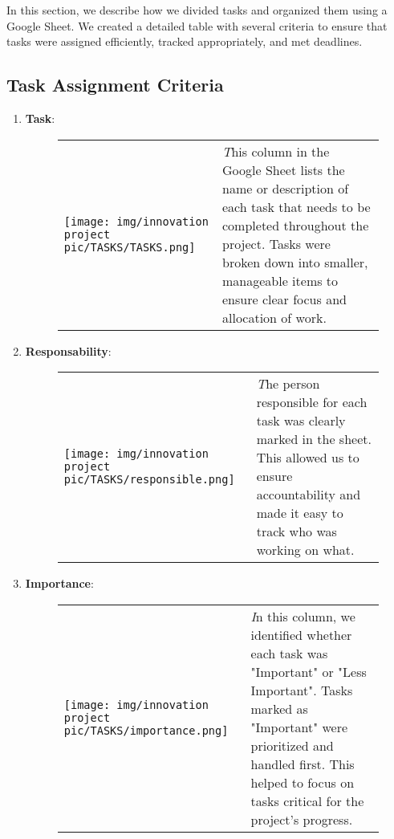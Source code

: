 In this section, we describe how we divided tasks and organized them using a Google Sheet. We created a detailed table with several criteria to ensure that tasks were assigned efficiently, tracked appropriately, and met deadlines. 

\subsection{Task Assignment Criteria}

\begin{enumerate}
    \item \textbf{Task}:

\begin{figure}[H]
   
    \begin{tabular}{m{} m{}}
        \texttt{[image: img/innovation project pic/TASKS/TASKS.png]} & 
        \textit This column in the Google Sheet lists the name or description of each task that needs to be completed throughout the project. Tasks were broken down into smaller, manageable items to ensure clear focus and allocation of work.
    \end{tabular}
\end{figure}
 
    \item \textbf{Responsability}:
\begin{figure}[H]
 
    \begin{tabular}{m{} m{}}
        \texttt{[image: img/innovation project pic/TASKS/responsible.png]} & 
        \textit The person responsible for each task was clearly marked in the sheet. This allowed us to ensure accountability and made it easy to track who was working on what.
    \end{tabular}
\end{figure}

\newpage

    \item \textbf{Importance}:
\begin{figure}[H]
    
    \begin{tabular}{m{} m{}}
        \texttt{[image: img/innovation project pic/TASKS/importance.png]} & 
        \textit In this column, we identified whether each task was "Important" or "Less Important". Tasks marked as "Important" were prioritized and handled first. This helped to focus on tasks critical for the project’s progress.
    \end{tabular}
\end{figure}


\end{enumerate}
